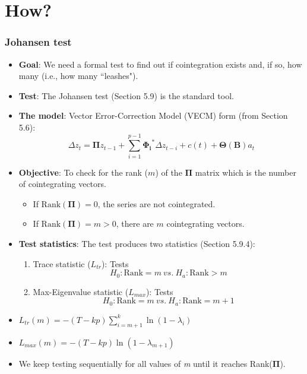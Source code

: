 \section{How?}

\begin{frame}[allowframebreaks]
	\frametitle{Johansen test}
	\small
	\begin{itemize}
		\item \textbf{Goal}: We need a formal test to find out if cointegration exists and, if so, how many (i.e., how many ``leashes").
		
		\item \textbf{Test}: The Johansen test (Section 5.9) is the standard tool.
		
		\item \textbf{The model}: Vector Error-Correction Model (VECM) form (from Section 5.6):
		$$\Delta z_t = \boldsymbol{\Pi} z_{t-1} + \sum_{i=1}^{p-1} \boldsymbol{\Phi_i}^* \Delta z_{t-i} + c(t) + \boldsymbol{\Theta(B)}a_t$$
		
		\item \textbf{Objective}: To check for the rank ($m$) of the $\boldsymbol{\Pi}$ matrix which is the number of cointegrating vectors.
		\begin{itemize}
			\item If $\text{Rank}(\boldsymbol{\Pi}) = 0$, the series are not cointegrated.
			
			\item If $\text{Rank}(\boldsymbol{\Pi}) = m > 0$, there are $m$ cointegrating vectors.
		\end{itemize}
	\end{itemize}
	\framebreak
	
	\begin{itemize}
		\item \textbf{Test statistics}: The test produces two statistics (Section 5.9.4):
		\begin{enumerate}
			\item Trace statistic ($L_{tr}$): Tests 
			$$H_0: \text{Rank} = m\ vs.\ H_a: \text{Rank} > m$$
			
			\item Max-Eigenvalue statistic ($L_{max}$): Tests 
			$$H_0: \text{Rank} = m\ vs.\ H_a: \text{Rank} = m+1$$
		\end{enumerate}
		
		\item $L_{tr}(m) = -(T - kp) \sum_{i=m+1}^{k} \ln(1 - \lambda_i)$
		
		\item $L_{max}(m) = -(T - kp) \ln(1 - \lambda_{m+1})$
		\item We keep testing sequentially for all values of \textit{m} until it reaches Rank($\boldsymbol{\Pi}$).
	\end{itemize}
\end{frame}

